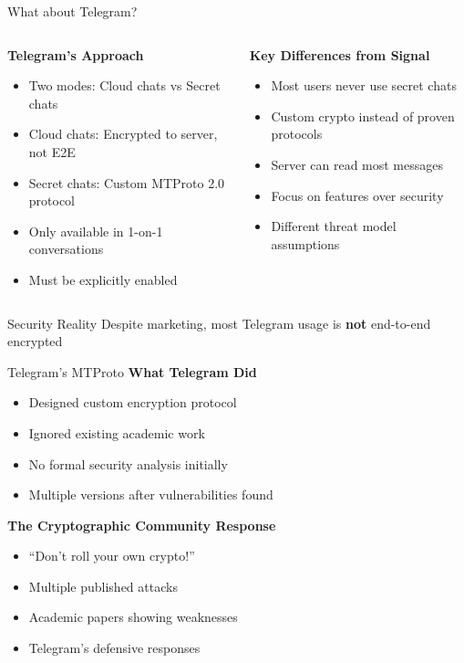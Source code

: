 \documentclass[aspectratio=169, lualatex, handout]{beamer}
\begin{document}
\begin{frame}{What about Telegram?}
	\begin{columns}
		\begin{column}{0.5\textwidth}
			\textbf{Telegram's Approach}
			\begin{itemize}
				\item Two modes: Cloud chats vs Secret chats
				\item Cloud chats: Encrypted to server, not E2E
				\item Secret chats: Custom MTProto 2.0 protocol
				\item Only available in 1-on-1 conversations
				\item Must be explicitly enabled
			\end{itemize}
		\end{column}
		\begin{column}{0.5\textwidth}
			\textbf{Key Differences from Signal}
			\begin{itemize}
				\item Most users never use secret chats
				\item Custom crypto instead of proven protocols
				\item Server can read most messages
				\item Focus on features over security
				\item Different threat model assumptions
			\end{itemize}
		\end{column}
	\end{columns}
	\begin{alertblock}{Security Reality}
		Despite marketing, most Telegram usage is \textbf{not} end-to-end encrypted
	\end{alertblock}
\end{frame}

\begin{frame}{Telegram's MTProto}
	\textbf{What Telegram Did}
	\begin{itemize}
		\item Designed custom encryption protocol
		\item Ignored existing academic work
		\item No formal security analysis initially
		\item Multiple versions after vulnerabilities found
	\end{itemize}
	\textbf{The Cryptographic Community Response}
	\begin{itemize}
		\item ``Don't roll your own crypto!''
		\item Multiple published attacks
		\item Academic papers showing weaknesses
		\item Telegram's defensive responses
	\end{itemize}
\end{frame}
\end{document}

